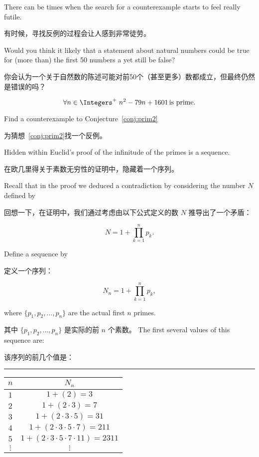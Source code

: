 There can be times when the search for a counterexample starts to feel
really futile.

有时候，寻找反例的过程会让人感到非常徒劳。

Would you think it likely that a statement about
natural numbers could be true for (more than) the first 50 numbers
a yet still be false?

你会认为一个关于自然数的陈述可能对前50个（甚至更多）数都成立，但最终仍然是错误的吗？

\begin{conj}
      \label{conj:prim2}
      \[ \forall n \in \Integers^+ \; n^2 - 79n + 1601 \, \mbox{is prime.} \]
\end{conj}

\begin{exer}
      Find a counterexample to Conjecture~\ref{conj:prim2}

      为猜想~\ref{conj:prim2}找一个反例。
\end{exer}

Hidden within Euclid's proof of the infinitude of the primes is
a sequence.

在欧几里得关于素数无穷性的证明中，隐藏着一个序列。

Recall that in the proof we deduced a contradiction
by considering the number $N$ defined by

回想一下，在证明中，我们通过考虑由以下公式定义的数 $N$ 推导出了一个矛盾：

\[  N = 1 + \prod_{k=1}^n p_k.
\]

Define a sequence by

定义一个序列：

\[  N_n  = 1 + \prod_{k=1}^n p_k, \]

where $\{p_1, p_2, \ldots , p_n\}$ are the actual first $n$ primes.

其中 $\{p_1, p_2, \ldots , p_n\}$ 是实际的前 $n$ 个素数。
The first several values of this sequence are:

该序列的前几个值是：

\rule{72pt}{0pt} \begin{tabular}{c|c}
      $n$      & $N_n$                                       \\ \hline
      $1$      & $1+(2) = 3$                                 \\
      $2$      & $1+(2\cdot 3) = 7$                          \\
      $3$      & $1+(2\cdot 3\cdot 5) = 31$                  \\
      $4$      & $1+(2\cdot 3\cdot 5\cdot 7) = 211$          \\
      $5$      & $1+(2\cdot 3\cdot 5\cdot 7\cdot 11) = 2311$ \\
      $\vdots$ & $\vdots$                                    \\
\end{tabular}

